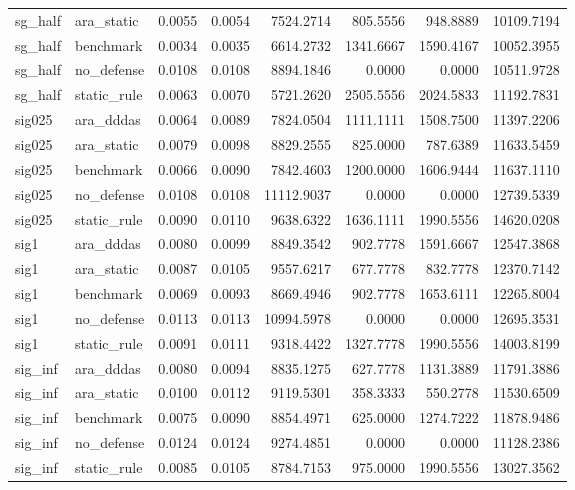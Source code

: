 \begin{tabular}{llrrrrrr}
sg_half & ara_static & 0.0055 & 0.0054 & 7524.2714 & 805.5556 & 948.8889 & 10109.7194 \\
sg_half & benchmark & 0.0034 & 0.0035 & 6614.2732 & 1341.6667 & 1590.4167 & 10052.3955 \\
sg_half & no_defense & 0.0108 & 0.0108 & 8894.1846 & 0.0000 & 0.0000 & 10511.9728 \\
sg_half & static_rule & 0.0063 & 0.0070 & 5721.2620 & 2505.5556 & 2024.5833 & 11192.7831 \\
sig025 & ara_dddas & 0.0064 & 0.0089 & 7824.0504 & 1111.1111 & 1508.7500 & 11397.2206 \\
sig025 & ara_static & 0.0079 & 0.0098 & 8829.2555 & 825.0000 & 787.6389 & 11633.5459 \\
sig025 & benchmark & 0.0066 & 0.0090 & 7842.4603 & 1200.0000 & 1606.9444 & 11637.1110 \\
sig025 & no_defense & 0.0108 & 0.0108 & 11112.9037 & 0.0000 & 0.0000 & 12739.5339 \\
sig025 & static_rule & 0.0090 & 0.0110 & 9638.6322 & 1636.1111 & 1990.5556 & 14620.0208 \\
sig1 & ara_dddas & 0.0080 & 0.0099 & 8849.3542 & 902.7778 & 1591.6667 & 12547.3868 \\
sig1 & ara_static & 0.0087 & 0.0105 & 9557.6217 & 677.7778 & 832.7778 & 12370.7142 \\
sig1 & benchmark & 0.0069 & 0.0093 & 8669.4946 & 902.7778 & 1653.6111 & 12265.8004 \\
sig1 & no_defense & 0.0113 & 0.0113 & 10994.5978 & 0.0000 & 0.0000 & 12695.3531 \\
sig1 & static_rule & 0.0091 & 0.0111 & 9318.4422 & 1327.7778 & 1990.5556 & 14003.8199 \\
sig_inf & ara_dddas & 0.0080 & 0.0094 & 8835.1275 & 627.7778 & 1131.3889 & 11791.3886 \\
sig_inf & ara_static & 0.0100 & 0.0112 & 9119.5301 & 358.3333 & 550.2778 & 11530.6509 \\
sig_inf & benchmark & 0.0075 & 0.0090 & 8854.4971 & 625.0000 & 1274.7222 & 11878.9486 \\
sig_inf & no_defense & 0.0124 & 0.0124 & 9274.4851 & 0.0000 & 0.0000 & 11128.2386 \\
sig_inf & static_rule & 0.0085 & 0.0105 & 8784.7153 & 975.0000 & 1990.5556 & 13027.3562 \\
\bottomrule
\end{tabular}

